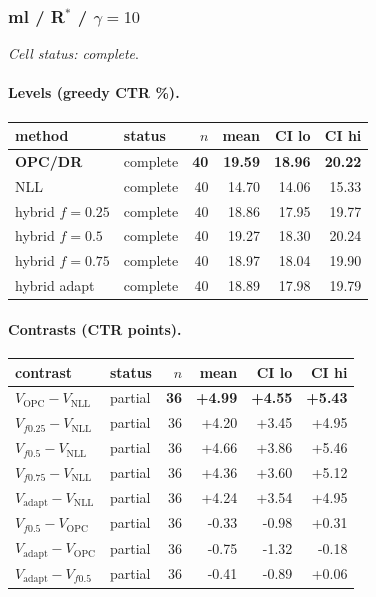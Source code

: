 \documentclass[10pt,a4paper]{article}
\begin{document}
\subsubsection{ml / R$^*$ / $\gamma=10$}
\emph{Cell status: complete}.
\paragraph{Levels (greedy CTR \%).}
{\centering\small\begin{tabular}{llrrrr}
\toprule method & status & $n$ & mean & CI lo & CI hi \\
\midrule
\textbf{OPC/DR} & complete & \textbf{40} & \textbf{19.59} & \textbf{18.96} & \textbf{20.22} \\
NLL & complete & 40 & 14.70 & 14.06 & 15.33 \\
hybrid $f{=}0.25$ & complete & 40 & 18.86 & 17.95 & 19.77 \\
hybrid $f{=}0.5$ & complete & 40 & 19.27 & 18.30 & 20.24 \\
hybrid $f{=}0.75$ & complete & 40 & 18.97 & 18.04 & 19.90 \\
hybrid adapt & complete & 40 & 18.89 & 17.98 & 19.79 \\
\bottomrule\end{tabular}\par}
\paragraph{Contrasts (CTR points).}
{\centering\small\begin{tabular}{llrrrr}
\toprule contrast & status & $n$ & mean & CI lo & CI hi \\
\midrule
\textbf{$V_{\mathrm{OPC}}-V_{\mathrm{NLL}}$} & partial & \textbf{36} & \textbf{+4.99} & \textbf{+4.55} & \textbf{+5.43} \\
$V_{f0.25}-V_{\mathrm{NLL}}$ & partial & 36 & +4.20 & +3.45 & +4.95 \\
$V_{f0.5}-V_{\mathrm{NLL}}$ & partial & 36 & +4.66 & +3.86 & +5.46 \\
$V_{f0.75}-V_{\mathrm{NLL}}$ & partial & 36 & +4.36 & +3.60 & +5.12 \\
$V_{\mathrm{adapt}}-V_{\mathrm{NLL}}$ & partial & 36 & +4.24 & +3.54 & +4.95 \\
$V_{f0.5}-V_{\mathrm{OPC}}$ & partial & 36 & -0.33 & -0.98 & +0.31 \\
$V_{\mathrm{adapt}}-V_{\mathrm{OPC}}$ & partial & 36 & -0.75 & -1.32 & -0.18 \\
$V_{\mathrm{adapt}}-V_{f0.5}$ & partial & 36 & -0.41 & -0.89 & +0.06 \\
\bottomrule\end{tabular}\par}
\end{document}
